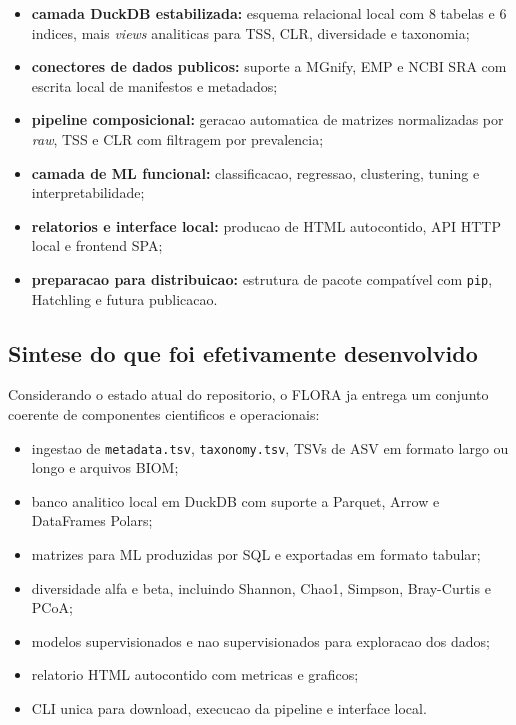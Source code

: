 \documentclass[12pt,a4paper]{article}
\begin{document}
\begin{itemize}[leftmargin=1.5cm]
    \item \textbf{camada DuckDB estabilizada:} esquema relacional local com 8 tabelas e 6 indices, mais \textit{views} analiticas para TSS, CLR, diversidade e taxonomia;
    \item \textbf{conectores de dados publicos:} suporte a MGnify, EMP e NCBI SRA com escrita local de manifestos e metadados;
    \item \textbf{pipeline composicional:} geracao automatica de matrizes normalizadas por \textit{raw}, TSS e CLR com filtragem por prevalencia;
    \item \textbf{camada de ML funcional:} classificacao, regressao, clustering, tuning e interpretabilidade;
    \item \textbf{relatorios e interface local:} producao de HTML autocontido, API HTTP local e frontend SPA;
    \item \textbf{preparacao para distribuicao:} estrutura de pacote compatível com \texttt{pip}, Hatchling e futura publicacao.
\end{itemize}

\subsection{Sintese do que foi efetivamente desenvolvido}

Considerando o estado atual do repositorio, o FLORA ja entrega um conjunto coerente de componentes cientificos e operacionais:

\begin{itemize}[leftmargin=1.5cm]
    \item ingestao de \texttt{metadata.tsv}, \texttt{taxonomy.tsv}, TSVs de ASV em formato largo ou longo e arquivos BIOM;
    \item banco analitico local em DuckDB com suporte a Parquet, Arrow e DataFrames Polars;
    \item matrizes para ML produzidas por SQL e exportadas em formato tabular;
    \item diversidade alfa e beta, incluindo Shannon, Chao1, Simpson, Bray-Curtis e PCoA;
    \item modelos supervisionados e nao supervisionados para exploracao dos dados;
    \item relatorio HTML autocontido com metricas e graficos;
    \item CLI unica para download, execucao da pipeline e interface local.
\end{itemize}
\end{document}
